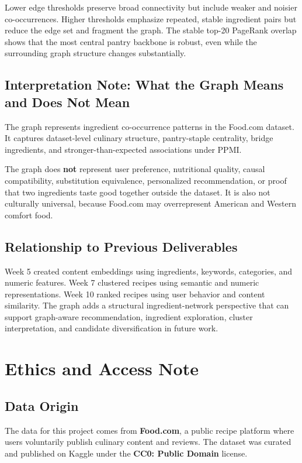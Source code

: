 \documentclass[11pt,a4paper]{article}
\begin{document}
Lower edge thresholds preserve broad connectivity but include weaker and noisier co-occurrences. Higher thresholds emphasize repeated, stable ingredient pairs but reduce the edge set and fragment the graph. The stable top-20 PageRank overlap shows that the most central pantry backbone is robust, even while the surrounding graph structure changes substantially.

\subsection{Interpretation Note: What the Graph Means and Does Not Mean}
The graph represents ingredient co-occurrence patterns in the Food.com dataset. It captures dataset-level culinary structure, pantry-staple centrality, bridge ingredients, and stronger-than-expected associations under PPMI.

The graph does \textbf{not} represent user preference, nutritional quality, causal compatibility, substitution equivalence, personalized recommendation, or proof that two ingredients taste good together outside the dataset. It is also not culturally universal, because Food.com may overrepresent American and Western comfort food.

\subsection{Relationship to Previous Deliverables}
Week 5 created content embeddings using ingredients, keywords, categories, and numeric features. Week 7 clustered recipes using semantic and numeric representations. Week 10 ranked recipes using user behavior and content similarity. The graph adds a structural ingredient-network perspective that can support graph-aware recommendation, ingredient exploration, cluster interpretation, and candidate diversification in future work.

\section{Ethics and Access Note}

\subsection{Data Origin}

The data for this project comes from \textbf{Food.com}, a public recipe platform where users voluntarily publish culinary content and reviews. The dataset was curated and published on Kaggle under the \textbf{CC0: Public Domain} license.
\end{document}
